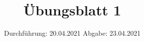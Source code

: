 

\subject{Elektronik}
\title{Übungsblatt 1}
\date{%
  Durchführung: 20.04.2021
  \hspace{3em}
  Abgabe: 23.04.2021
}



\maketitle
\thispagestyle{empty}
\tableofcontents
\newpage






\printbibliography{}


